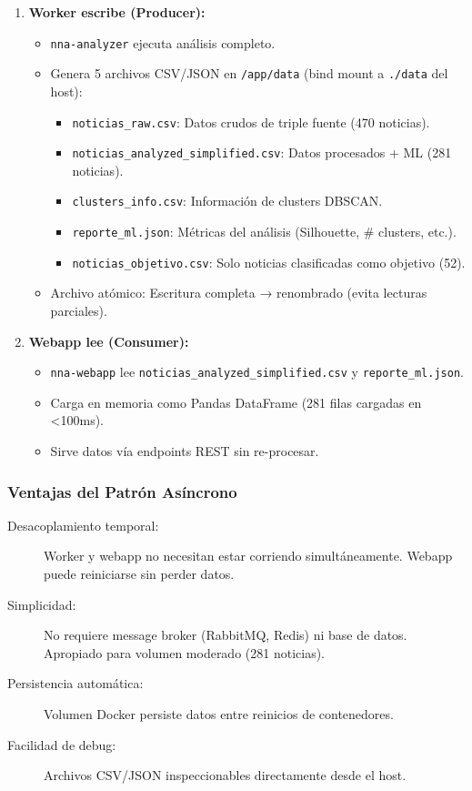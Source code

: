 \begin{enumerate}
    \item \textbf{Worker escribe (Producer):} 
    \begin{itemize}
        \item \texttt{nna-analyzer} ejecuta análisis completo.
        \item Genera 5 archivos CSV/JSON en \texttt{/app/data} (bind mount a \texttt{./data} del host):
        \begin{itemize}
            \item \texttt{noticias\_raw.csv}: Datos crudos de triple fuente (470 noticias).
            \item \texttt{noticias\_analyzed\_simplified.csv}: Datos procesados + ML (281 noticias).
            \item \texttt{clusters\_info.csv}: Información de clusters DBSCAN.
            \item \texttt{reporte\_ml.json}: Métricas del análisis (Silhouette, \# clusters, etc.).
            \item \texttt{noticias\_objetivo.csv}: Solo noticias clasificadas como objetivo (52).
        \end{itemize}
        \item Archivo atómico: Escritura completa → renombrado (evita lecturas parciales).
    \end{itemize}
    
    \item \textbf{Webapp lee (Consumer):}
    \begin{itemize}
        \item \texttt{nna-webapp} lee \texttt{noticias\_analyzed\_simplified.csv} y \texttt{reporte\_ml.json}.
        \item Carga en memoria como Pandas DataFrame (281 filas cargadas en <100ms).
        \item Sirve datos vía endpoints REST sin re-procesar.
    \end{itemize}
\end{enumerate}

\subsubsection{Ventajas del Patrón Asíncrono}

\begin{description}
    \item[Desacoplamiento temporal:] Worker y webapp no necesitan estar corriendo simultáneamente. Webapp puede reiniciarse sin perder datos.
    
    \item[Simplicidad:] No requiere message broker (RabbitMQ, Redis) ni base de datos. Apropiado para volumen moderado (281 noticias).
    
    \item[Persistencia automática:] Volumen Docker persiste datos entre reinicios de contenedores.
    
    \item[Facilidad de debug:] Archivos CSV/JSON inspeccionables directamente desde el host.
\end{description}


